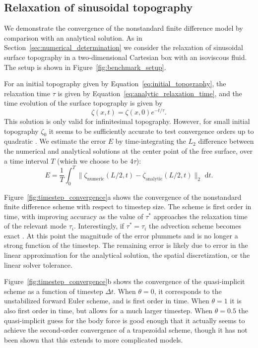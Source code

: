\documentclass[preprint,12pt,authoryear]{elsarticle}
\begin{document}
\subsection{Relaxation of sinusoidal topography}
\label{sec:topography_relaxation}

We demonstrate the convergence of the nonstandard finite difference model by comparison 
with an analytical solution. 
As in Section~\ref{sec:numerical_determination} we consider the relaxation
of sinusoidal surface topography in a two-dimensional Cartesian box with an isoviscous fluid.
The setup is shown in Figure~\ref{fig:benchmark_setup}.

For an initial topography given by Equation~\eqref{eq:initial_topography}, the relaxation time $\tau$
is given by Equation~\eqref{eq:analytic_relaxation_time}, and the time evolution of the surface 
topography is given by
\begin{equation}
  \zeta(x,t) = \zeta(x,0) e^{-t/\tau}.
\end{equation}
This solution is only valid for infinitesimal topography. However, for small
initial topography $\zeta_0$ it seems to be sufficiently accurate to test convergence orders up 
to quadratic \citep{kramer2012implicit, furuichi2015implicit}.
We estimate the error $E$ by time-integrating the $L_2$ difference between the numerical and analytical
solutions at the center point of the free surface, over a time interval $T$ (which we choose to be $4\tau$):
\begin{equation}
E = \frac{1}{T}\int_0^{T} \lVert \zeta_\mathrm{numeric}(L/2, t) - \zeta_\mathrm{analytic}(L/2, t) \rVert_2 \text{ d}t.
\end{equation}

Figure~\ref{fig:timestep_convergence}a shows the convergence of the nonstandard finite difference scheme 
with respect to timestep size. The scheme is first order in time, with improving accuracy as the value of $\tau^*$ approaches
the relaxation time of the relevant mode $\tau_i$. Interestingly, if $\tau^* = \tau_i$ the advection scheme
becomes exact \citep{mickens2002nonstandard}. At this point the magnitude of the error plummets and is no longer 
a strong function of the timestep. The remaining error is likely due to error in the linear approximation for 
the analytical solution, the spatial discretization, or the linear solver tolerance. 

Figure~\ref{fig:timestep_convergence}b shows the convergence of the quasi-implicit scheme as a function of timestep $\Delta t$.
When $\theta=0$, it corresponds to the unstabilized forward Euler scheme, and is first order in time. 
When $\theta=1$ it is also first order in time, but allows for a much larger timestep.  When $\theta=0.5$
the quasi-implicit guess for the body force is good enough that it actually seems to achieve the second-order 
convergence of a trapezoidal scheme, though it has not been shown that this extends to more complicated models.
\end{document}
